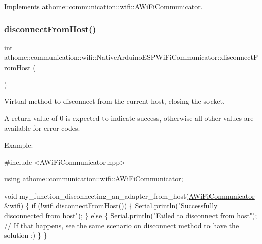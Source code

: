 Implements \mbox{\hyperlink{classathome_1_1communication_1_1wifi_1_1_a_wi_fi_communicator_a6131240ac0daa0f9fb4d46871feea4c2}{athome\+::communication\+::wifi\+::\+A\+Wi\+Fi\+Communicator}}.

\mbox{\label{classathome_1_1communication_1_1wifi_1_1_native_arduino_e_s_p_wi_fi_communicator_a8fa44a5078cb7d61f01b306e1d0d1bfe}} 
\subsubsection{\texorpdfstring{disconnect\+From\+Host()}{disconnectFromHost()}}
{\footnotesize\ttfamily int athome\+::communication\+::wifi\+::\+Native\+Arduino\+E\+S\+P\+Wi\+Fi\+Communicator\+::disconnect\+From\+Host (\begin{DoxyParamCaption}{ }\end{DoxyParamCaption})\hspace{0.3cm}{\ttfamily [virtual]}}

Virtual method to disconnect from the current host, closing the socket.

A return value of 0 is expected to indicate success, otherwise all other values are available for error codes.

Example\+:


\begin{DoxyCode}
\textcolor{preprocessor}{#include <AWiFiCommunicator.hpp>}

\textcolor{keyword}{using} \mbox{\hyperlink{classathome_1_1communication_1_1wifi_1_1_a_wi_fi_communicator}{athome::communication::wifi::AWiFiCommunicator}};

\textcolor{keywordtype}{void} my\_function\_disconnecting\_an\_adapter\_from\_host(\mbox{\hyperlink{classathome_1_1communication_1_1wifi_1_1_a_wi_fi_communicator_a0098148fe8d0eeee99b7f8f72a72a900}{AWiFiCommunicator}}
&wifi) \{ \textcolor{keywordflow}{if} (!wifi.disconnectFromHost()) \{ Serial.println(\textcolor{stringliteral}{"Successfully}
\textcolor{stringliteral}{disconnected from host"}); \} \textcolor{keywordflow}{else} \{ Serial.println(\textcolor{stringliteral}{"Failed to disconnect}
\textcolor{stringliteral}{from host"}); \textcolor{comment}{// If that happens, see the same scenario on disconnect method}
to have the solution ;)
  \}
\}
\end{DoxyCode}
 


